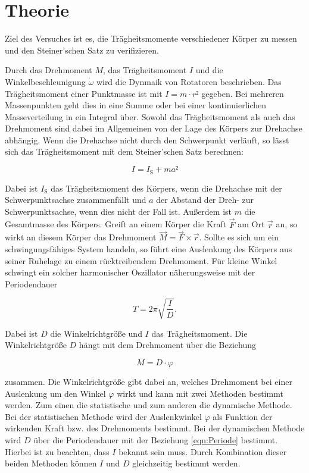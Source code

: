 \section{Theorie}
\label{sec:Theorie}

Ziel des Versuches ist es, die Trägheitsmomente verschiedener Körper 
zu messen und den Steiner'schen Satz zu verifizieren.

Durch das Drehmoment $M$, das Trägheitsmoment $I$ und die Winkelbeschleunigung 
$\dot\omega$ wird die Dynmaik von Rotatoren beschrieben. Das Trägheitsmoment
einer Punktmasse ist mit $I = m\cdot r²$ gegeben. Bei mehreren Massenpunkten
geht dies in eine Summe oder bei einer kontinuierlichen Masseverteilung 
in ein Integral über. Sowohl das Trägheitsmoment als auch das Drehmoment 
sind dabei im Allgemeinen von der Lage des Körpers zur Drehachse abhängig. 
Wenn die Drehachse nicht durch den Schwerpunkt verläuft, so lässt sich das
Trägheitsmoment mit dem Steiner'schen Satz berechnen: 

\begin{equation}
I = I_\text{S} + ma² 
\label{eqn:Steiner}
\end{equation}

Dabei ist $I_\text{S}$ das Trägheitsmoment des Körpers, wenn die Drehachse mit der 
Schwerpunktsachse zusammenfällt und $a$ der Abstand der Dreh- zur Schwerpunktsachse, 
wenn dies nicht der Fall ist. Außerdem ist $m$ die Gesamtmasse des Körpers.
Greift an einem Körper die Kraft $\vec{F}$ am Ort $\vec{r}$ an, so wirkt 
an diesem Körper das Drehmoment $\vec{M} = \vec{F} \times \vec{r}$. Sollte es
sich um ein schwingungsfähiges System handeln, so führt eine Auslenkung des 
Körpers aus seiner Ruhelage zu einem rücktreibendem Drehmoment. Für kleine
Winkel schwingt ein solcher harmonischer Oszillator näherungsweise mit 
der Periodendauer

\begin{equation}
T = 2\pi\sqrt{\frac{I}{D}}.
\label{eqn:Periode}
\end{equation}

Dabei ist $D$ die Winkelrichtgröße und $I$ das Trägheitsmoment. Die 
Winkelrichtgröße $D$ hängt mit dem Drehmoment über die Beziehung 

\begin{equation}
M = D\cdot\varphi
\label{eqn:Winkelrichtgröße}
\end{equation}

zusammen. Die Winkelrichtgröße gibt dabei an, welches Drehmoment bei einer 
Auslenkung um den Winkel $\varphi$ wirkt und kann mit zwei Methoden bestimmt 
werden. Zum einen die statistische und zum anderen die dynamische Methode. 
Bei der statistischen Methode wird der Auslenkwinkel $\varphi$ als Funktion
der wirkenden Kraft bzw. des Drehmoments bestimmt. Bei der dynamischen 
Methode wird $D$ über die Periodendauer mit der Beziehung \eqref{eqn:Periode}
bestimmt. Hierbei ist zu beachten, dass $I$ bekannt sein muss. 
Durch Kombination dieser beiden Methoden können $I$ und $D$ gleichzeitig
bestimmt werden. 

